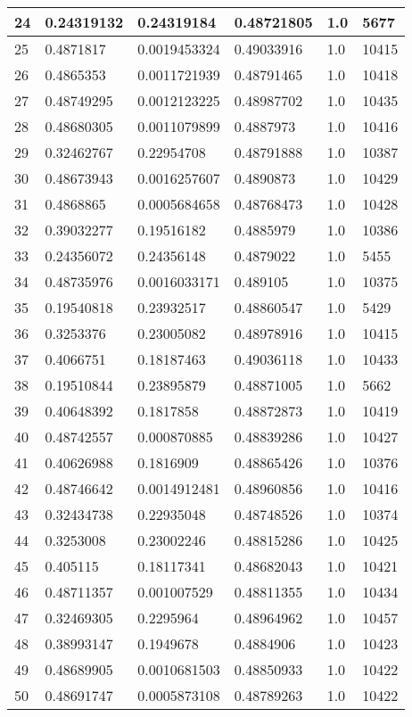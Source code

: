 \begin{longtable}{|l|l|l|l|l|l|}
24 & 0.24319132 & 0.24319184 & 0.48721805 & 1.0 & 5677 \\ \hline 
25 & 0.4871817 & 0.0019453324 & 0.49033916 & 1.0 & 10415 \\ \hline 
26 & 0.4865353 & 0.0011721939 & 0.48791465 & 1.0 & 10418 \\ \hline 
27 & 0.48749295 & 0.0012123225 & 0.48987702 & 1.0 & 10435 \\ \hline 
28 & 0.48680305 & 0.0011079899 & 0.4887973 & 1.0 & 10416 \\ \hline 
29 & 0.32462767 & 0.22954708 & 0.48791888 & 1.0 & 10387 \\ \hline 
30 & 0.48673943 & 0.0016257607 & 0.4890873 & 1.0 & 10429 \\ \hline 
31 & 0.4868865 & 0.0005684658 & 0.48768473 & 1.0 & 10428 \\ \hline 
32 & 0.39032277 & 0.19516182 & 0.4885979 & 1.0 & 10386 \\ \hline 
33 & 0.24356072 & 0.24356148 & 0.4879022 & 1.0 & 5455 \\ \hline 
34 & 0.48735976 & 0.0016033171 & 0.489105 & 1.0 & 10375 \\ \hline 
35 & 0.19540818 & 0.23932517 & 0.48860547 & 1.0 & 5429 \\ \hline 
36 & 0.3253376 & 0.23005082 & 0.48978916 & 1.0 & 10415 \\ \hline 
37 & 0.4066751 & 0.18187463 & 0.49036118 & 1.0 & 10433 \\ \hline 
38 & 0.19510844 & 0.23895879 & 0.48871005 & 1.0 & 5662 \\ \hline 
39 & 0.40648392 & 0.1817858 & 0.48872873 & 1.0 & 10419 \\ \hline 
40 & 0.48742557 & 0.000870885 & 0.48839286 & 1.0 & 10427 \\ \hline 
41 & 0.40626988 & 0.1816909 & 0.48865426 & 1.0 & 10376 \\ \hline 
42 & 0.48746642 & 0.0014912481 & 0.48960856 & 1.0 & 10416 \\ \hline 
43 & 0.32434738 & 0.22935048 & 0.48748526 & 1.0 & 10374 \\ \hline 
44 & 0.3253008 & 0.23002246 & 0.48815286 & 1.0 & 10425 \\ \hline 
45 & 0.405115 & 0.18117341 & 0.48682043 & 1.0 & 10421 \\ \hline 
46 & 0.48711357 & 0.001007529 & 0.48811355 & 1.0 & 10434 \\ \hline 
47 & 0.32469305 & 0.2295964 & 0.48964962 & 1.0 & 10457 \\ \hline 
48 & 0.38993147 & 0.1949678 & 0.4884906 & 1.0 & 10423 \\ \hline 
49 & 0.48689905 & 0.0010681503 & 0.48850933 & 1.0 & 10422 \\ \hline 
50 & 0.48691747 & 0.0005873108 & 0.48789263 & 1.0 & 10422 \\ \hline 
\end{longtable}